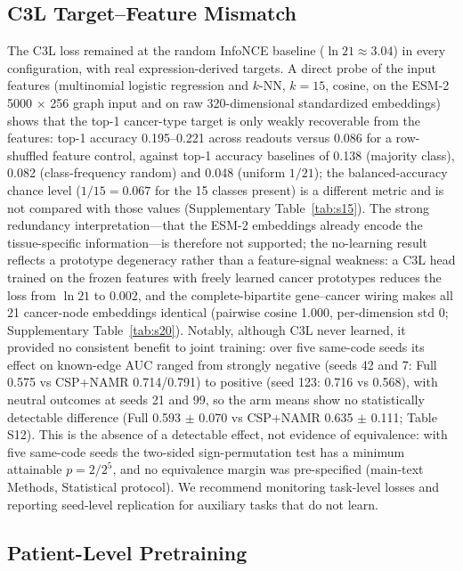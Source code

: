 \documentclass[11pt,a4paper]{article}
\newcommand{\supptab}[1]{Supplementary Table~\ref{#1}}
\begin{document}
\subsection{C3L Target--Feature Mismatch}

The C3L loss remained at the random InfoNCE baseline ($\ln 21 \approx 3.04$) in every configuration, with real expression-derived targets. A direct probe of the input features (multinomial logistic regression and $k$-NN, $k=15$, cosine, on the ESM-2 5000 $\times$ 256 graph input and on raw 320-dimensional standardized embeddings) shows that the top-1 cancer-type target is only weakly recoverable from the features: top-1 accuracy 0.195--0.221 across readouts versus 0.086 for a row-shuffled feature control, against top-1 accuracy baselines of 0.138 (majority class), 0.082 (class-frequency random) and 0.048 (uniform $1/21$); the balanced-accuracy chance level ($1/15 = 0.067$ for the 15 classes present) is a different metric and is not compared with those values (\supptab{tab:s15}). The strong redundancy interpretation---that the ESM-2 embeddings already encode the tissue-specific information---is therefore not supported; the no-learning result reflects a prototype degeneracy rather than a feature-signal weakness: a C3L head trained on the frozen features with freely learned cancer prototypes reduces the loss from $\ln 21$ to 0.002, and the complete-bipartite gene--cancer wiring makes all 21 cancer-node embeddings identical (pairwise cosine 1.000, per-dimension std 0; \supptab{tab:s20}). Notably, although C3L never learned, it provided no consistent benefit to joint training: over five same-code seeds its effect on known-edge AUC ranged from strongly negative (seeds 42 and 7: Full 0.575 vs CSP+NAMR 0.714/0.791) to positive (seed 123: 0.716 vs 0.568), with neutral outcomes at seeds 21 and 99, so the arm means show no statistically detectable difference (Full 0.593 $\pm$ 0.070 vs CSP+NAMR 0.635 $\pm$ 0.111; Table S12). This is the absence of a detectable effect, not evidence of equivalence: with five same-code seeds the two-sided sign-permutation test has a minimum attainable $p = 2/2^{5}$, and no equivalence margin was pre-specified (main-text Methods, Statistical protocol). We recommend monitoring task-level losses and reporting seed-level replication for auxiliary tasks that do not learn.

\subsection{Patient-Level Pretraining}
\end{document}
